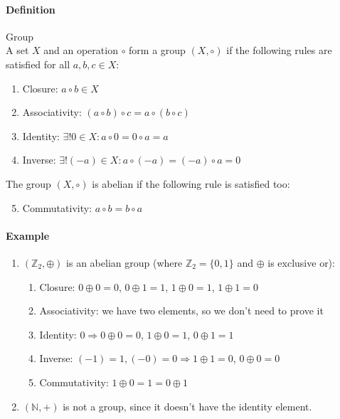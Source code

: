 \documentclass{article}
\newcommand{\N}{\mathbb{N}}
\newcommand{\Z}{\mathbb{Z}}
\newcommand{\Def}{\paragraph{Definition}}
\newcommand{\Example}{\paragraph{Example}}
\begin{document}
  \Def Group
\\A set $X$ and an operation $\circ$ form a group $(X, \circ)$ if the following
  rules are satisfied for all $a, b, c \in X$:
  \begin{enumerate}[label=(\roman*)]
    \item Closure: $a \circ b \in X$

    \item Associativity: $(a \circ b) \circ c = a \circ (b \circ c)$

    \item Identity: $\exists! 0 \in X : a \circ 0 = 0 \circ a = a$

    \item Inverse: $\exists! (-a) \in X : a \circ (-a) = (-a) \circ a = 0$
    \end{enumerate}
    The group $(X, \circ)$ is abelian if the following rule is satisfied too:
    \begin{enumerate}[label=(\roman*)]
    \setcounter{enumi}{4}
    \item Commutativity: $a \circ b = b \circ a$
  \end{enumerate}

  \Example
  \begin{enumerate}[label=(\arabic*)]
    \item $(\Z_2, \oplus)$ is an abelian group (where $\Z_2 = \{ 0, 1 \}$ and
    $\oplus$ is exclusive or):
    \begin{enumerate}[label=(\roman*)]
      \item Closure: $0 \oplus 0 = 0$, $0 \oplus 1 = 1$, $1 \oplus 0 = 1$,
      $1 \oplus 1 = 0$
      \item Associativity: we have two elements, so we don't need to prove it
      \item Identity: $0 \Rightarrow 0 \oplus 0 = 0$, $1 \oplus 0 = 1$,
      $0 \oplus 1 = 1$
      \item Inverse: $(-1) = 1, (-0) = 0 \Rightarrow 1 \oplus 1 = 0$,
      $0 \oplus 0 = 0$
      \item Commutativity: $1 \oplus 0 = 1 = 0 \oplus 1$
    \end{enumerate}

    \item $(\N, +)$ is not a group, since it doesn't have the identity element.
  \end{enumerate}
\end{document}

